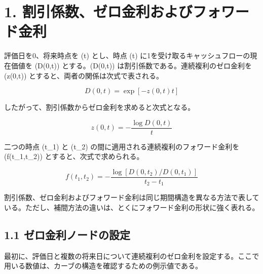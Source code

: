 \documentclass[
  letterpaper,
  DIV=11,
  numbers=noendperiod]{scrreprt}
\begin{document}
\section{1.
割引係数、ゼロ金利およびフォワード金利}\label{ux5272ux5f15ux4fc2ux6570ux30bcux30edux91d1ux5229ux304aux3088ux3073ux30d5ux30a9ux30efux30fcux30c9ux91d1ux5229}

評価日を0、将来時点を (t) とし、時点 (t)
に1を受け取るキャッシュフローの現在価値を (D(0,t)) とする。(D(0,t))
は割引係数である。連続複利のゼロ金利を (z(0,t))
とすると、両者の関係は次式で表される。

\[
D(0,t)
=
\exp\left[-z(0,t)t\right]
\]

したがって、割引係数からゼロ金利を求めると次式となる。

\[
z(0,t)
=
-\frac{\log D(0,t)}{t}
\]

二つの時点 (t\_1) と (t\_2) の間に適用される連続複利のフォワード金利を
(f(t\_1,t\_2)) とすると、次式で求められる。

\[
f(t_1,t_2)
=
-\frac{
\log\left[D(0,t_2)/D(0,t_1)\right]
}{
t_2-t_1
}
\]

割引係数、ゼロ金利およびフォワード金利は同じ期間構造を異なる方法で表している。ただし、補間方法の違いは、とくにフォワード金利の形状に強く表れる。

\subsection{1.1
ゼロ金利ノードの設定}\label{ux30bcux30edux91d1ux5229ux30ceux30fcux30c9ux306eux8a2dux5b9a}

最初に、評価日と複数の将来日について連続複利のゼロ金利を設定する。ここで用いる数値は、カーブの構造を確認するための例示値である。
\end{document}
